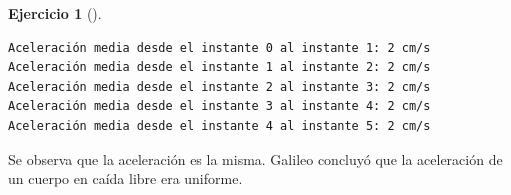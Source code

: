 \documentclass[
  a4paper,
]{scrreport}
\newenvironment{Shaded}{\begin{snugshade}}{\end{snugshade}}
\newcommand{\ControlFlowTok}[1]{\textcolor[rgb]{0.00,0.23,0.31}{#1}}
\newcommand{\FloatTok}[1]{\textcolor[rgb]{0.68,0.00,0.00}{#1}}
\newcommand{\FunctionTok}[1]{\textcolor[rgb]{0.28,0.35,0.67}{#1}}
\newcommand{\KeywordTok}[1]{\textcolor[rgb]{0.00,0.23,0.31}{#1}}
\newcommand{\NormalTok}[1]{\textcolor[rgb]{0.00,0.23,0.31}{#1}}
\newcommand{\OperatorTok}[1]{\textcolor[rgb]{0.37,0.37,0.37}{#1}}
\newcommand{\SpecialCharTok}[1]{\textcolor[rgb]{0.37,0.37,0.37}{#1}}
\newcommand{\StringTok}[1]{\textcolor[rgb]{0.13,0.47,0.30}{#1}}
\theoremstyle{definition}
\newtheorem{exercise}{Ejercicio}[chapter]
\theoremstyle{remark}
\begin{document}
\begin{exercise}[]
\begin{enumerate}
\begin{tcolorbox}
\begin{Shaded}
\end{Shaded}

\begin{verbatim}
Aceleración media desde el instante 0 al instante 1: 2 cm/s
Aceleración media desde el instante 1 al instante 2: 2 cm/s
Aceleración media desde el instante 2 al instante 3: 2 cm/s
Aceleración media desde el instante 3 al instante 4: 2 cm/s
Aceleración media desde el instante 4 al instante 5: 2 cm/s
\end{verbatim}

  Se observa que la aceleración es la misma. Galileo concluyó que la
  aceleración de un cuerpo en caída libre era uniforme.

  \end{tcolorbox}
\end{enumerate}

\end{exercise}
\end{document}
